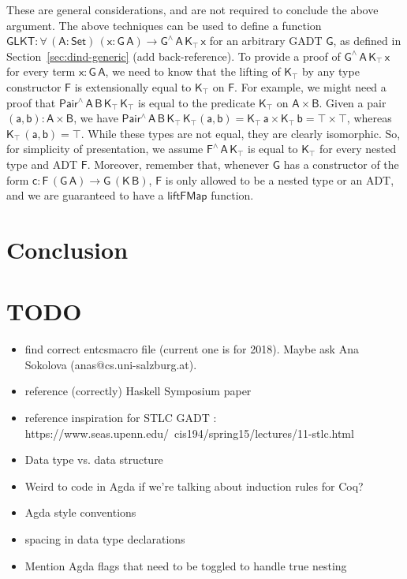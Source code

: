 \documentclass[9pt]{entcs}
\begin{document}
{\color{red} These are general considerations, and are not required to conclude the above argument.}
The above techniques can be used
to define a function $\mathsf{GLKT : \forall\, (A : Set)\, (x : G\,A) \to G^{\wedge}\, A\, K_\top\, x}$
for an arbitrary GADT $\mathsf{G}$,
as defined in Section~\ref{sec:dind-generic} {\color{red} (add back-reference)}.
To provide a proof of $\mathsf{G^{\wedge}\, A\, K_\top \, x}$ for every term $\mathsf{x : G\, A}$, 
we need to know that the lifting of $\mathsf{K_\top}$ by any type constructor $\mathsf{F}$
is extensionally equal to $\mathsf{K_\top}$ on $\mathsf{F}$. 
For example, we might need a proof that $\mathsf{Pair^{\wedge}\,A\,B\,K_\top\,K_\top}$
is equal to the predicate $\mathsf{K_\top}$ on $\mathsf{A \times B}$. 
Given a pair $\mathsf{(a , b) : A \times B}$, we have
$\mathsf{Pair^{\wedge}\,A\,B\,K_\top\,K_\top (a, b) = K_\top \, a \times K_\top\, b = \top \times \top}$,
whereas $\mathsf{K_\top\, (a, b) = \top}$.
While these types are not equal, they are clearly isomorphic.
So, for simplicity of presentation, we assume $\mathsf{F^{\wedge}\,A\,K_\top}$
is equal to $\mathsf{K_\top}$ for every nested type and ADT $\mathsf{F}$. 
Moreover, remember that, whenever $\mathsf{G}$ has a constructor of the form $\mathsf{c : F \, (G\, A) \to G\, (K\,B)}$, 
$\mathsf{F}$ is only allowed to be a nested type or an ADT,
and we are guaranteed to have a $\mathsf{liftFMap}$ function. 



\section{Conclusion}\label{sec:conclusion}


\section{TODO}

\begin{itemize}
\item find correct entcsmacro file (current one is for 2018). Maybe ask Ana Sokolova (anas@cs.uni-salzburg.at).
\item reference (correctly) Haskell Symposium paper
\item reference inspiration for STLC GADT : https://www.seas.upenn.edu/~cis194/spring15/lectures/11-stlc.html
\item Data type vs. data structure
\item Weird to code in Agda if we're talking about induction rules for
  Coq? 
\item Agda style conventions
\item spacing in data type declarations
\item Mention Agda flags that need to be toggled to handle true nesting
\end{itemize}
\end{document}
